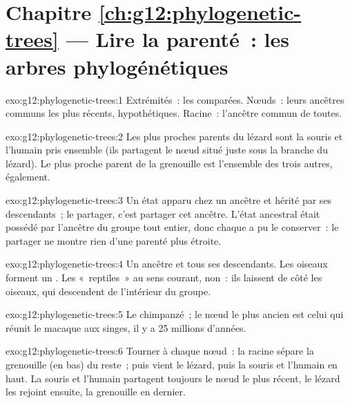 \section*{Chapitre \ref{ch:g12:phylogenetic-trees} --- Lire la parenté~: les arbres phylogénétiques}

\begin{solution}{exo:g12:phylogenetic-trees:1}
Extrémités~: les  comparées. Nœuds~: leurs ancêtres communs les
plus récents, hypothétiques. Racine~: l'ancêtre commun de toutes.
\end{solution}

\begin{solution}{exo:g12:phylogenetic-trees:2}
Les plus proches parents du lézard sont la souris et l'humain pris
ensemble (ils partagent le nœud situé juste sous la branche du
lézard). Le plus proche parent de la grenouille est l'ensemble des
trois autres, également.
\end{solution}

\begin{solution}{exo:g12:phylogenetic-trees:3}
Un état apparu chez un ancêtre et hérité par ses descendants~; le
partager, c'est partager cet ancêtre. L'état ancestral était possédé
par l'ancêtre du groupe tout entier, donc chaque  a pu le
conserver~: le partager ne montre rien d'une parenté plus étroite.
\end{solution}

\begin{solution}{exo:g12:phylogenetic-trees:4}
Un ancêtre et tous ses descendants. Les oiseaux forment un . Les
«~reptiles~» au sens courant, non~: ils laissent de côté les oiseaux,
qui descendent de l'intérieur du groupe.
\end{solution}

\begin{solution}{exo:g12:phylogenetic-trees:5}
Le chimpanzé~; le nœud le plus ancien est celui qui réunit le macaque
aux singes, il y a 25 millions d'années.
\end{solution}

\begin{solution}{exo:g12:phylogenetic-trees:6}
Tourner à chaque nœud~: la racine sépare la grenouille (en bas) du
reste~; puis vient le lézard, puis la souris et l'humain en haut. La
souris et l'humain partagent toujours le nœud le plus récent, le
lézard les rejoint ensuite, la grenouille en dernier.
\end{solution}


